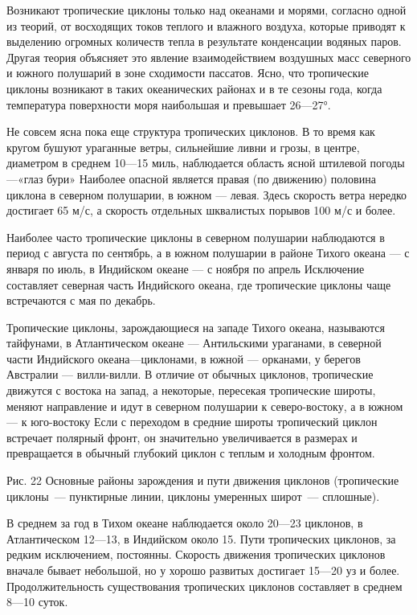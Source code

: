 Возникают тропические циклоны только над океанами и морями, согласно одной из теорий, от восходящих токов теплого и влажного воздуха, которые приводят к выделению огромных количеств тепла в результате конденсации водяных паров. Другая теория объясняет это явление взаимодействием воздушных масс северного и южного полушарий в зоне сходимости пассатов. Ясно, что тропические циклоны возникают в таких океанических районах и в те сезоны года, когда температура поверхности моря наибольшая и превышает 26—27°.

Не совсем ясна пока еще структура тропических циклонов. В то время как кругом бушуют ураганные ветры, сильнейшие ливни и грозы, в центре, диаметром в среднем 10—15 миль, наблюдается область ясной штилевой погоды—«глаз бури» Наиболее опасной является правая (по движению) половина циклона в северном полушарии, в южном — левая. Здесь скорость ветра нередко достигает 65 м/с, а скорость отдельных шквалистых порывов 100 м/с и более.

Наиболее часто тропические циклоны в северном полушарии наблюдаются в период с августа по сентябрь, а в южном полушарии в районе Тихого океана — с января по июль, в Индийском океане — с ноября по апрель Исключение составляет северная часть Индийского океана, где тропические циклоны чаще встречаются с мая по декабрь.

Тропические циклоны, зарождающиеся на западе Тихого океана, называются тайфунами, в Атлантическом океане — Антильскими ураганами, в северной части Индийского океана—циклонами, в южной — орканами, у берегов Австралии — вилли-вилли. В отличие от обычных циклонов, тропические движутся с востока на запад, а некоторые, пересекая тропические широты, меняют направление и идут в северном полушарии к северо-востоку, а в южном — к юго-востоку Если с переходом в средние широты тропический циклон встречает полярный фронт, он значительно увеличивается в размерах и превращается в обычный глубокий циклон с теплым и холодным фронтом.


Рис. 22 Основные районы зарождения и пути движения циклонов
(тропические циклоны~--- пунктирные линии, циклоны умеренных широт~--- сплошные).

В среднем за год в Тихом океане наблюдается около 20—23 циклонов, в Атлантическом 12—13, в Индийском около 15. Пути тропических циклонов, за редким исключением, постоянны. Скорость движения тропических циклонов вначале бывает небольшой, но у хорошо развитых достигает 15—20 уз и более. Продолжительность существования тропических циклонов составляет в среднем 8—10 суток.

